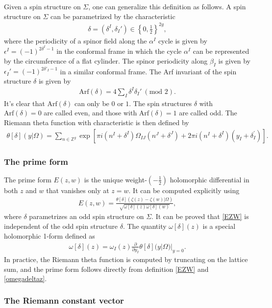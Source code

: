 \documentclass[12pt]{article}
\def\ie{\begin{equation}\begin{aligned}}
\def\fe{\end{aligned}\end{equation}}
\numberwithin{equation}{section}
\begin{document}
Given a spin structure on $\Sigma$, one can generalize this definition as follows. A spin structure on $\Sigma$ can be parametrized by the characteristic
\ie \label{spinstr}
\delta=(\delta^I, \delta_I')\in \left\{0,\tfrac{1}{2}\right\}^{2g},
\fe
where the periodicity of a spinor field along the $\alpha^I$ cycle is given by $\epsilon^I=(-1)^{2\delta^I-1}$ in the conformal frame in which the cycle $\alpha^I$ can be represented by the circumference of a flat cylinder. The spinor periodicity along $\beta_I$ is given by $\epsilon_I'=(-1)^{2\delta'_I-1}$ in a similar conformal frame. The Arf invariant of the spin structure $\delta$ is given by
\ie \label{arf}
\mathrm{Arf}(\delta)=4\sum_{I}\delta^I \delta_I'\ (\text{mod }2).
\fe 
It's clear that $\mathrm{Arf}(\delta)$ can only be $0$ or $1$. The spin structures $\delta$ with $\mathrm{Arf}(\delta) = 0$ are called even, and those with $\mathrm{Arf}(\delta) = 1$ are called odd. The Riemann theta function with characteristic is then defined by 
\ie
\theta[\delta](y |\Omega) = \sum_{n \in \mathbb{Z}^g} \exp \left[\pi i (n^I+\delta^I) \Omega_{I J}(n^J+\delta^J)+2 \pi i(n^I+\delta^I)(y_I+\delta_I^{\prime})\right].
\fe

\subsubsection*{The prime form}

The prime form $E(z,w)$ is the unique weight-$(-\frac{1}{2})$ holomorphic differential in both $z$ and $w$ that vanishes only at $z=w$. It can be computed explicitly using
\ie \label{EZW}
E(z,w) = \frac{\theta[\delta](\zeta(z)-\zeta(w)|\Omega)}{\sqrt{\omega[\delta](z)\omega[\delta](w)}},
\fe
where $\delta$ parametrizes an odd spin structure on $\Sigma$. It can be proved that \eqref{EZW} is independent of the odd spin structure $\delta$. The quantity $\omega[\delta](z)$ is a special holomorphic 1-form defined as
\ie \label{omegadeltaz}
\omega[\delta](z)=\omega_I(z)\frac{\partial}{\partial y_I}\theta[\delta](y|\Omega)|_{y=0}.
\fe
In practice, the Riemann theta function is computed by truncating on the lattice sum, and the prime form follows directly from definition \eqref{EZW} and \eqref{omegadeltaz}.

\subsubsection*{The Riemann constant vector}
\end{document}

